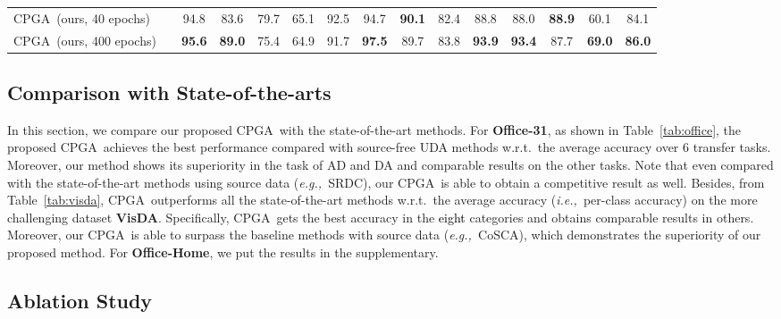 \documentclass{article}
\def\ie{\emph{i.e.,~}}
\def\eg{\emph{e.g.,~}}
\def\wrt{w.r.t.~}
\def\mata{\textcolor{black}}
\def\ournet{CPGA}
\newcommand{\cmark}{\ding{51}}\newcommand{\xmark}{\ding{55}}\renewcommand{\algorithmicrequire}{\textbf{Require:}}
\begin{document}
\begin{table*}[!hbt]
\begin{center}
{\begin{tabular}{lcccccccccccccc}
        \midrule
        \ournet~(ours, 40 epochs) & \cmark & 94.8 & 83.6 & 79.7 & 65.1 & 92.5 & 94.7 & \textbf{90.1} & 82.4 & 88.8 & 88.0 & \textbf{88.9} & {60.1} & {84.1} \\
        \ournet~(ours, 400 epochs) & \cmark & \textbf{95.6} & \textbf{89.0} & 75.4 & 64.9 & 91.7 & \textbf{97.5} & 89.7 & 83.8 & \textbf{93.9} & \textbf{93.4} & 87.7 & \textbf{69.0} & \textbf{86.0} \\
\bottomrule
        \end{tabular}
    }
    \end{center}
    \vspace{-0.1in}
    \caption{\label{tab:visda}Classification accuracies (\%) on the large-scale \textbf{VisDA} dataset (ResNet-101).}
\end{table*}



\subsection{Comparison with State-of-the-arts}

In this section, we compare our proposed \ournet~with the state-of-the-art methods.
For \textbf{Office-31}, as shown in Table~\ref{tab:office}, the proposed \ournet~achieves the best performance compared with source-free UDA methods \wrt the average accuracy over 6 transfer tasks. Moreover, our method shows its superiority in the task of AD and DA and comparable results on the other tasks.
Note that even compared with the state-of-the-art methods using source data (\eg SRDC), our \ournet~is able to obtain a competitive result as well.
Besides, from Table~\ref{tab:visda}, \ournet~outperforms all the state-of-the-art methods \wrt the average accuracy (\ie per-class accuracy) on the more challenging dataset \textbf{VisDA}. Specifically, \ournet~gets the best accuracy in the \mata{eight} categories and obtains comparable results in others.
Moreover, our \ournet~is able to surpass the baseline methods with source data (\eg CoSCA), which demonstrates the superiority of our proposed method.
For \textbf{Office-Home}, we put the results in the supplementary.










\subsection{Ablation Study}
\end{document}
